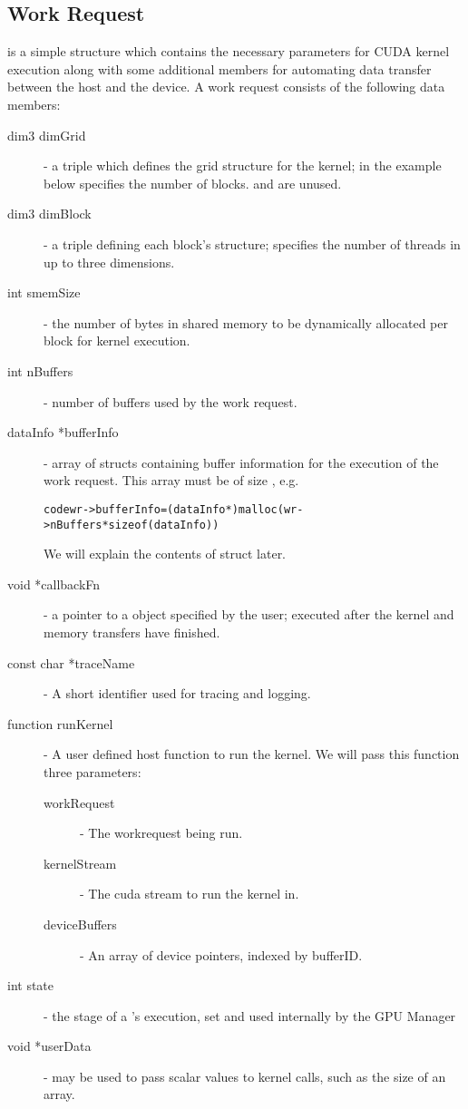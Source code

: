 \subsection{Work Request}
 is a simple structure which contains the necessary parameters
for CUDA kernel execution along with some additional members for automating
data transfer between the host and the device.
A work request consists of the following data members:

\begin{description}
\item[dim3 dimGrid]- a triple which defines the grid structure for the kernel;
in the example below  specifies the number of blocks.
 and  are unused.

\item[dim3 dimBlock]- a triple defining each block's structure;
specifies the number of threads in up to three dimensions.

\item[int smemSize]- the number of bytes in shared memory to be dynamically
allocated per block for kernel execution.

\item[int nBuffers]- number of buffers used by the work request.

\item[dataInfo *bufferInfo]- array of  structs containing buffer
information for the execution of the work request. This array must be of size , e.g.
\begin{alltt}
code{wr->bufferInfo = (dataInfo *) malloc(wr->nBuffers * sizeof(dataInfo))}
\end{alltt}
We will explain the contents of  struct later.

\item[void *callbackFn]- a pointer to a  object specified by the user;
executed after the kernel and memory transfers have finished.

\item[const char *traceName]- A short identifier used for tracing and logging.

\item[function runKernel]- A user defined host function to run the kernel.
   We will pass this function three parameters:
   \begin{description}
   \item[workRequest]- The workrequest being run.
   \item[kernelStream]- The cuda stream to run the kernel in.
   \item[deviceBuffers]- An array of device pointers, indexed by bufferID.
   \end{description}

\item[int state]- the stage of a 's execution, set and used internally by the GPU Manager

\item[void *userData]-  may be used to pass scalar values to kernel
calls, such as the size of an array.

\end{description}

